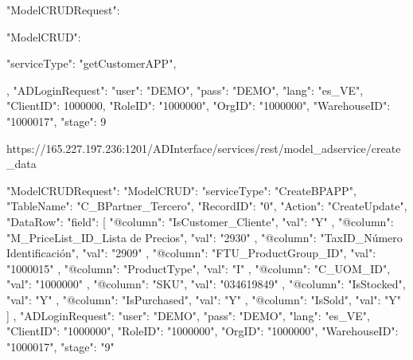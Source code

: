{
    "ModelCRUDRequest": {
        "ModelCRUD": {
            "serviceType": "getCustomerAPP",
           
        },
        "ADLoginRequest": {
            "user": "DEMO",
            "pass": "DEMO",
            "lang": "es_VE",
            "ClientID": 1000000,
            "RoleID": "1000000",
            "OrgID": "1000000",
            "WarehouseID": "1000017",
            "stage": 9
        }
    }
}


https://165.227.197.236:1201/ADInterface/services/rest/model_adservice/create_data

{
    "ModelCRUDRequest": {
        "ModelCRUD": {
            "serviceType": "CreateBPAPP",
            "TableName": "C_BPartner_Tercero",
            "RecordID": "0",
            "Action": "CreateUpdate",
            "DataRow": {
                "field": [
                    {
                        "@column": "IsCustomer_Cliente",
                        "val": "Y"
                    },
                    {
                        "@column": "M_PriceList_ID_Lista de Precios",
                        "val": "2930"
                    },
                    {
                        "@column": "TaxID_Número Identificación",
                        "val": "2909"
                    },
                    {
                        "@column": "FTU_ProductGroup_ID",
                        "val": "1000015"
                    },
                    {
                        "@column": "ProductType",
                        "val": "I"
                    },
                    {
                        "@column": "C_UOM_ID",
                        "val": "1000000"
                    },
                    {
                        "@column": "SKU",
                        "val": "034619849"
                    },
                    {
                        "@column": "IsStocked",
                        "val": "Y"
                    },
                    {
                        "@column": "IsPurchased",
                        "val": "Y"
                    },
                    {
                        "@column": "IsSold",
                        "val": "Y"
                    }
                ]
            }
        },
        "ADLoginRequest": {
            "user": "DEMO",
            "pass": "DEMO",
            "lang": "es_VE",
            "ClientID": "1000000",
            "RoleID": "1000000",
            "OrgID": "1000000",
            "WarehouseID": "1000017",
            "stage": "9"
        }
    }
}



